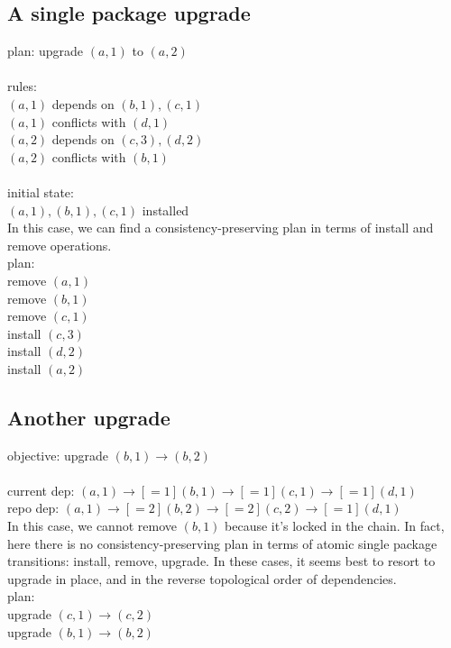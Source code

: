 \documentclass[a4paper,11pt]{article}
\begin{document}
\subsection{A single package upgrade}

plan: upgrade $(a,1)$ to $(a,2)$\\
\\
rules:\\
  $(a,1)$ depends on $(b,1), (c,1)$ \\
  $(a,1)$ conflicts with $(d,1)$\\
  $(a,2)$ depends on $(c,3), (d,2)$\\
  $(a,2)$ conflicts with $(b,1)$\\
\\
initial state:\\
  $(a,1), (b,1), (c,1)$ installed \\

In this case, we can find a consistency-preserving plan in terms of
install and remove operations.
\\
plan:\\
  remove $(a,1)$\\
  remove $(b,1)$\\
  remove $(c,1)$\\
  install $(c,3)$\\
  install $(d,2)$\\
  install $(a,2)$\\

\subsection{Another upgrade}

objective: upgrade $(b,1) \to (b,2)$\\
\\
current dep: $(a,1) \to[=1] (b,1) \to[=1] (c,1) \to[=1] (d,1)$\\
repo dep: \nobreakspace{} \nobreakspace$(a,1) \to[=2] (b,2) \to[=2] (c,2) \to[=1] (d,1)$\\

In this case, we cannot remove $(b,1)$ because it's locked in the
chain. In fact, here there is no consistency-preserving plan in terms
of atomic single package transitions: install, remove, upgrade. In
these cases, it seems best to resort to upgrade in place, and in the
reverse topological order of dependencies.
\\
plan:\\
 upgrade $(c,1) \to (c,2)$\\
 upgrade $(b,1) \to (b,2)$\\
\end{document}
